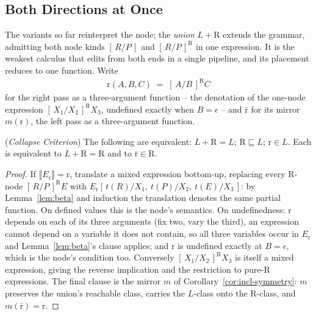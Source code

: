 \documentclass[runningheads,envcountsect]{llncs}
\begin{document}
\subsection{Both Directions at Once}
\label{ssec:union}

The variants so far reinterpret the node; the \emph{union} $L{+}\mathrm{R}$ extends the grammar, admitting both node kinds $[\,R/P\,]$ and $[\,R/P\,]^{\mathrm{R}}$ in one expression. It is the weakest calculus that edits from both ends in a single pipeline, and its placement reduces to one function. Write
\begin{align*}
    \mathrm{r}(A, B, C) \;=\; [\,A/B\,]^{\mathrm{R}} C
\end{align*}
for the right pass as a three-argument function -- the denotation of the one-node expression $[\,X_1/X_2\,]^{\mathrm{R}} X_3$, undefined exactly when $B = \epsilon$ -- and $\bar{\mathrm{r}}$ for its mirror $m(\mathrm{r})$, the left pass as a three-argument function.

\begin{theorem}
    (\emph{Collapse Criterion})
    \label{thm:union-collapse}
    The following are equivalent: $L{+}\mathrm{R} = L$; $\mathrm{R} \sqsubseteq L$; $\mathrm{r} \in L$. Each is equivalent to $L{+}\mathrm{R} = \mathrm{R}$ and to $\bar{\mathrm{r}} \in \mathrm{R}$.
\end{theorem}

\begin{proof}
    If $\llbracket E_{\mathrm{r}} \rrbracket = \mathrm{r}$, translate a mixed expression bottom-up, replacing every $\mathrm{R}$-node $[\,R/P\,]^{\mathrm{R}} E$ with $E_{\mathrm{r}}[\,t(R)/X_1,\ t(P)/X_2,\ t(E)/X_3\,]$: by Lemma~\ref{lem:beta} and induction the translation denotes the same partial function. On defined values this is the node's semantics. On undefinedness: $\mathrm{r}$ depends on each of its three arguments (fix two, vary the third), an expression cannot depend on a variable it does not contain, so all three variables occur in $E_{\mathrm{r}}$ and Lemma~\ref{lem:beta}'s clause applies; and $\mathrm{r}$ is undefined exactly at $B = \epsilon$, which is the node's condition too. Conversely $[\,X_1/X_2\,]^{\mathrm{R}} X_3$ is itself a mixed expression, giving the reverse implication and the restriction to pure-$\mathrm{R}$ expressions. The final clause is the mirror $m$ of Corollary~\ref{cor:incl-symmetry}: $m$ preserves the union's reachable class, carries the $L$-class onto the $\mathrm{R}$-class, and $m(\bar{\mathrm{r}}) = \mathrm{r}$.
\end{proof}
\end{document}
